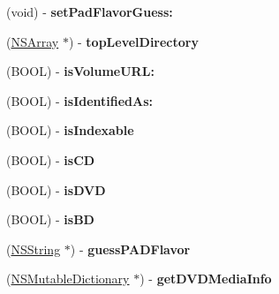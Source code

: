 \begin{DoxyCompactItemize}
\item 
\hypertarget{interface_d_a_c_volume_a825b3db979c357e7136d7738feb5dcc6}{
(void) -\/ {\bfseries setPadFlavorGuess:}}
\label{interface_d_a_c_volume_a825b3db979c357e7136d7738feb5dcc6}

\item 
\hypertarget{interface_d_a_c_volume_a11e2afb0b0b8e35761707e66a826d5c4}{
(\hyperlink{class_n_s_array}{NSArray} $\ast$) -\/ {\bfseries topLevelDirectory}}
\label{interface_d_a_c_volume_a11e2afb0b0b8e35761707e66a826d5c4}

\item 
\hypertarget{interface_d_a_c_volume_ae2b46f1f78f7f9516b413a92b359100c}{
(BOOL) -\/ {\bfseries isVolumeURL:}}
\label{interface_d_a_c_volume_ae2b46f1f78f7f9516b413a92b359100c}

\item 
\hypertarget{interface_d_a_c_volume_a9e98a1c9e6ed28139fb23537e6bdecc1}{
(BOOL) -\/ {\bfseries isIdentifiedAs:}}
\label{interface_d_a_c_volume_a9e98a1c9e6ed28139fb23537e6bdecc1}

\item 
\hypertarget{interface_d_a_c_volume_a63fcf3e0b8ebc640894876dda6026848}{
(BOOL) -\/ {\bfseries isIndexable}}
\label{interface_d_a_c_volume_a63fcf3e0b8ebc640894876dda6026848}

\item 
\hypertarget{interface_d_a_c_volume_ac2a2159dfe20d3234102dda29f383cf9}{
(BOOL) -\/ {\bfseries isCD}}
\label{interface_d_a_c_volume_ac2a2159dfe20d3234102dda29f383cf9}

\item 
\hypertarget{interface_d_a_c_volume_a9232fe9bf051dc1193e6aa200b820c0c}{
(BOOL) -\/ {\bfseries isDVD}}
\label{interface_d_a_c_volume_a9232fe9bf051dc1193e6aa200b820c0c}

\item 
\hypertarget{interface_d_a_c_volume_a3fd1a4ab51244da3fa2ce4bb4f4f5670}{
(BOOL) -\/ {\bfseries isBD}}
\label{interface_d_a_c_volume_a3fd1a4ab51244da3fa2ce4bb4f4f5670}

\item 
\hypertarget{interface_d_a_c_volume_a8fad0622742b34273bae954d492db187}{
(\hyperlink{class_n_s_string}{NSString} $\ast$) -\/ {\bfseries guessPADFlavor}}
\label{interface_d_a_c_volume_a8fad0622742b34273bae954d492db187}

\item 
\hypertarget{interface_d_a_c_volume_a10abd2d76f1e2f5efed332524479f892}{
(\hyperlink{class_n_s_mutable_dictionary}{NSMutableDictionary} $\ast$) -\/ {\bfseries getDVDMediaInfo}}
\label{interface_d_a_c_volume_a10abd2d76f1e2f5efed332524479f892}


\end{DoxyCompactItemize}
